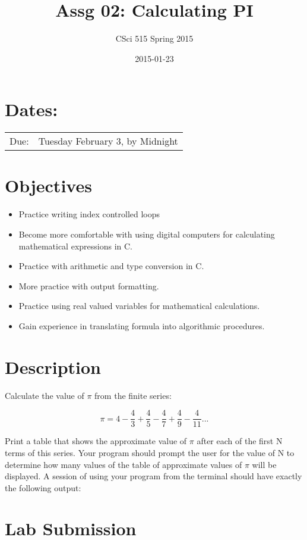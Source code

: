 \documentclass[11pt]{article}
\title{Assg 02: Calculating PI}
\author{CSci 515 Spring 2015}
\date{2015-01-23}
\begin{document}
\maketitle


\section*{Dates:}
\label{sec-1}


\begin{center}
\begin{tabular}{ll}
 Due:  &  Tuesday February 3, by Midnight  \\
\end{tabular}
\end{center}
\section*{Objectives}
\label{sec-2}

\begin{itemize}
\item Practice writing index controlled loops
\item Become more comfortable with using digital computers for calculating mathematical expressions in C.
\item Practice with arithmetic and type conversion in C.
\item More practice with output formatting.
\item Practice using real valued variables for mathematical calculations.
\item Gain experience in translating formula into algorithmic procedures.
\end{itemize}
\section*{Description}
\label{sec-3}

Calculate the value of $\pi$ from the finite series:

$$ \pi = 4 - \frac{4}{3} + \frac{4}{5} - \frac{4}{7} + \frac{4}{9} - \frac{4}{11} ... $$

Print a table that shows the approximate value of $\pi$ after each of
the first N terms of this series.  Your program should prompt the user
for the value of N to determine how many values of the table of
approximate values of $\pi$ will be displayed.  A session of using
your program from the terminal should have exactly the following
output:
\section*{Lab Submission}
\label{sec-4}
\end{document}
